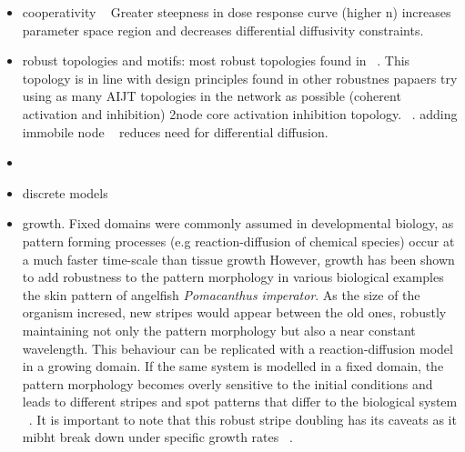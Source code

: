 \begin{itemize}
    \item cooperativity ~\parencite{Diambra2015a} Greater steepness in dose response curve (higher n) increases parameter space region and decreases differential diffusivity constraints.
    \item robust topologies and motifs: most robust topologies found in ~\parencite{Scholes2019}. This topology is in line with design principles found in other robustnes papaers try using as many AIJT topologies in the network as possible (coherent activation and inhibition) 2node core activation inhibition topology. ~\parencite{Zheng2016}. adding immobile node ~\parencite{Zheng2016,Diego2018} reduces need for differential diffusion.  %
    \item
    \item discrete models  %
    \item growth. Fixed domains were commonly assumed in developmental biology, as pattern forming processes (e.g reaction-diffusion of chemical species) occur at a much faster time-scale than tissue growth %
    However, growth has been shown to add robustness to the pattern morphology in various biological examples the skin pattern of angelﬁsh \textit{Pomacanthus imperator}. As the size of the
    organism incresed, new stripes would appear between the old ones, robustly maintaining not only the pattern morphology but also a near constant wavelength. This behaviour can be replicated with a reaction-diffusion model in a growing domain. If the same system is modelled in a fixed domain, the pattern morphology becomes overly sensitive to the initial conditions and leads to different stripes and spot patterns that differ to the biological system ~\parencite{Kondo2010a}. It is important to note that this robust stripe doubling has its caveats as it mibht break down under specific growth rates ~\parencite{Maini2012}.

\end{itemize}
